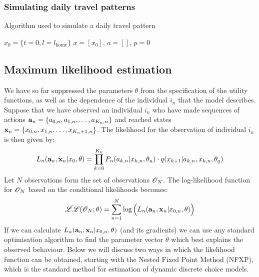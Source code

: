 \subsubsection{Simulating daily travel patterns}
\begin{algorithm}
\caption{Algorithm used to simulate a daily travel pattern}
\begin{algorithmic}[1]
\State $x_0 = \{t=0,l=l_{\text{home}} \}$
\State $x=[x_0]$, $a = []$, $p=0$
\EndWhile
\end{algorithmic}
\end{algorithm}

\subsection{Maximum likelihood estimation}
We have so far suppressed the parameters $\theta$ from the specification of the utility functions, as well as the dependence of the individual $i_n$ that the model describes. 
Suppose that we have observed an individual $i_n$ who have made sequences of actions ${\bf a}_n=\{a_{0,n},a_{1,n},\dots,a_{K_n,n}\}$ and reached states ${\bf x}_n=\{x_{0,n},x_{1,n},\dots,x_{K_n+1,n}\}$. The likelihood for the observation of individual $i_n$ is then given by:
\begin{equation*}
    L_n(\ve{a}_n,\ve{x}_n|x_0,\theta)= \prod_{k=0}^{K_n}  P_n(a_{k,n}|x_{k,n},\theta_u)\cdot q(x_{k+1}|a_{k,n},x_{k,n},\theta_q)
\end{equation*}
Let $N$ observations form the set of observations $\mathscr{O}_N$. The log-likelihood function for $\mathscr{O}_N$ based on the conditional likelihoods becomes:
\begin{equation*} \label{eq:cond_like}
\bar{\LL}(\obs_N;\theta) = \sum_{n=1}^N \log \Bl L_n(\ve{a}_n,\ve{x}_n|x_{0,n},\theta)\Bh
\end{equation*}
If we can calculate $L_n({\bf a}_n,{\bf x}_n|x_{0,n},\theta)$ (and its gradients) we can use any standard optimisation algorithm to find the parameter vector $\theta$ which best explains the observed behaviour. Below we will discuss two ways in which the likelihood function can be obtained, starting with the Nested Fixed Point Method (NFXP), which is the standard method for estimation of dynamic discrete choice models.

